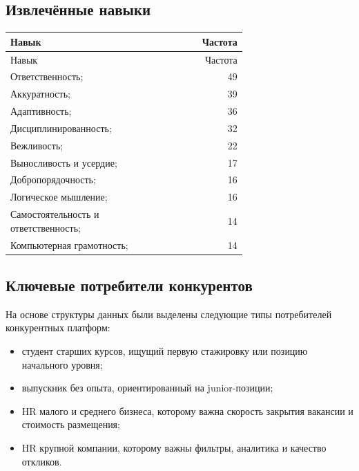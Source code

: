 \documentclass[12pt,a4paper]{article}
\begin{document}
\subsection{Извлечённые навыки}
\begin{longtable}{p{0.68\linewidth}r}
\toprule
Навык & Частота\\
\midrule
\endfirsthead
\toprule
Навык & Частота\\
\midrule
\endhead
Ответственность; & 49\\
Аккуратность; & 39\\
Адаптивность; & 36\\
Дисциплинированность; & 32\\
Вежливость; & 22\\
Выносливость и усердие; & 17\\
Добропорядочность; & 16\\
Логическое мышление; & 16\\
Самостоятельность и ответственность; & 14\\
Компьютерная грамотность; & 14\\
\bottomrule
\end{longtable}

\subsection{Ключевые потребители конкурентов}
На основе структуры данных были выделены следующие типы потребителей конкурентных платформ:
\begin{itemize}
\item студент старших курсов, ищущий первую стажировку или позицию начального уровня;
\item выпускник без опыта, ориентированный на junior-позиции;
\item HR малого и среднего бизнеса, которому важна скорость закрытия вакансии и стоимость размещения;
\item HR крупной компании, которому важны фильтры, аналитика и качество откликов.
\end{itemize}
\end{document}
